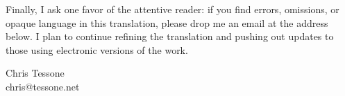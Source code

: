 Finally, I ask one favor of the attentive reader: if you find errors, omissions, or opaque language in this translation, please drop me an email at the address below. I plan to continue refining the translation and pushing out updates to those using electronic versions of the work.

\begin{flushright}
Chris Tessone\\
chris@tessone.net
\end{flushright}
